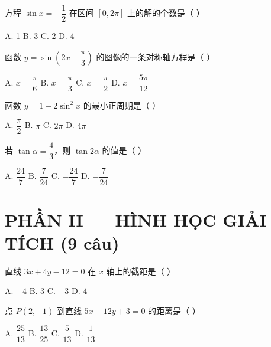 \documentclass[11pt, a4paper]{article}
\begin{document}
\begin{baitap}[7]
方程 $\sin x = -\dfrac{1}{2}$ 在区间 $[0, 2\pi]$ 上的解的个数是（ ）
\par\vspace{3pt}
\noindent A. 1 \quad B. 3 \quad C. 2 \quad D. 4
\end{baitap}

\begin{baitap}[8]
函数 $y = \sin\!\left(2x - \dfrac{\pi}{3}\right)$ 的图像的一条对称轴方程是（ ）
\par\vspace{3pt}
\noindent A. $x = \dfrac{\pi}{6}$ \quad B. $x = \dfrac{\pi}{3}$ \quad C. $x = \dfrac{\pi}{2}$ \quad D. $x = \dfrac{5\pi}{12}$
\end{baitap}

\begin{baitap}[9]
函数 $y = 1 - 2\sin^2 x$ 的最小正周期是（ ）
\par\vspace{3pt}
\noindent A. $\dfrac{\pi}{2}$ \quad B. $\pi$ \quad C. $2\pi$ \quad D. $4\pi$
\end{baitap}

\begin{baitap}[10]
若 $\tan\alpha = \dfrac{4}{3}$，则 $\tan 2\alpha$ 的值是（ ）
\par\vspace{3pt}
\noindent A. $\dfrac{24}{7}$ \quad B. $\dfrac{7}{24}$ \quad C. $-\dfrac{24}{7}$ \quad D. $-\dfrac{7}{24}$
\end{baitap}

\section{PHẦN II — HÌNH HỌC GIẢI TÍCH (9 câu)}

\begin{baitap}[11]
直线 $3x + 4y - 12 = 0$ 在 $x$ 轴上的截距是（ ）
\par\vspace{3pt}
\noindent A. $-4$ \quad B. $3$ \quad C. $-3$ \quad D. $4$
\end{baitap}

\begin{baitap}[12]
点 $P(2, -1)$ 到直线 $5x - 12y + 3 = 0$ 的距离是（ ）
\par\vspace{3pt}
\noindent A. $\dfrac{25}{13}$ \quad B. $\dfrac{13}{25}$ \quad C. $\dfrac{5}{13}$ \quad D. $\dfrac{1}{13}$
\end{baitap}
\end{document}
